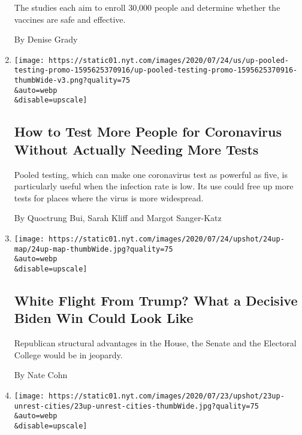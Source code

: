 \begin{enumerate}
  The studies each aim to enroll 30,000 people and determine whether the
  vaccines are safe and effective.

  By Denise Grady
\item
  \href{/interactive/2020/07/27/upshot/coronavirus-pooled-testing.html}{}

  \texttt{[image: https://static01.nyt.com/images/2020/07/24/us/up-pooled-testing-promo-1595625370916/up-pooled-testing-promo-1595625370916-thumbWide-v3.png?quality=75\\\&auto=webp\\\&disable=upscale]}

  \hypertarget{how-to-test-more-people-for-coronavirus-without-actually-needing-more-tests}{%
  \subsection{How to Test More People for Coronavirus Without Actually
  Needing More
  Tests}\label{how-to-test-more-people-for-coronavirus-without-actually-needing-more-tests}}

  Pooled testing, which can make one coronavirus test as powerful as
  five, is particularly useful when the infection rate is low. Its use
  could free up more tests for places where the virus is more
  widespread.

  By Quoctrung Bui, Sarah Kliff and Margot Sanger-Katz
\item
  \href{/2020/07/24/upshot/biden-polls-demographics.html}{}

  \texttt{[image: https://static01.nyt.com/images/2020/07/24/upshot/24up-map/24up-map-thumbWide.jpg?quality=75\\\&auto=webp\\\&disable=upscale]}

  \hypertarget{white-flight-from-trump-what-a-decisive-biden-win-could-look-like}{%
  \subsection{White Flight From Trump? What a Decisive Biden Win Could
  Look
  Like}\label{white-flight-from-trump-what-a-decisive-biden-win-could-look-like}}

  Republican structural advantages in the House, the Senate and the
  Electoral College would be in jeopardy.

  By Nate Cohn
\item
  \href{/2020/07/23/upshot/trump-portland.html}{}

  \texttt{[image: https://static01.nyt.com/images/2020/07/23/upshot/23up-unrest-cities/23up-unrest-cities-thumbWide.jpg?quality=75\\\&auto=webp\\\&disable=upscale]}


\end{enumerate}
